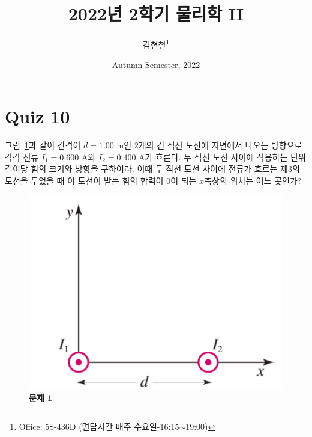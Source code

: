 \documentclass[tightenlines,floatfix,nofootinbib,superscriptaddress,fleqn]{revtex4}
\begin{document}
\title{\Large 2022년 2학기 물리학 II}
\author{김현철\footnote{Office: 5S-436D (면담시간 매주
    수요일-16:15$\sim$19:00)}} 
\date{Autumn Semester, 2022}

\maketitle

\section*{\large Quiz 10}
그림~\ref{fig:1}과 같이 간격이 $d=1.00$ m인 2개의 긴 직선 도선에
지면에서 나오는 방향으로 각각 전류 $I_1=0.600$ A와 $I_2=0.400$ A가
흐른다. 두 직선 도선 사이에 작용하는 단위길이당 힘의 크기와 방향을
구하여라. 이때 두 직선 도선 사이에 전류가 흐르는 제3의 도선을 두었을
때 이 도선이 받는 힘의 합력이 0이 되는 $x$축상의 위치는 어느 곳인가? 
\begin{figure}[htp]
  \centering
  \includegraphics[scale=0.4]{qfig10-20221005-1.pdf}
  \caption{\textbf{문제 1}}
  \label{fig:1}
\end{figure}
\end{document}
